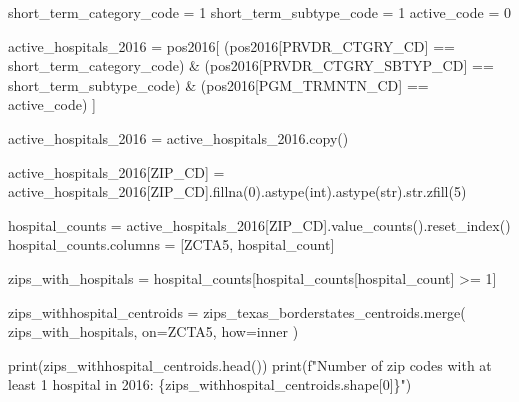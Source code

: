 \documentclass[
  letterpaper,
  DIV=11,
  numbers=noendperiod]{scrartcl}
\newenvironment{Shaded}{\begin{snugshade}}{\end{snugshade}}
\newcommand{\BuiltInTok}[1]{\textcolor[rgb]{0.00,0.23,0.31}{#1}}
\newcommand{\DecValTok}[1]{\textcolor[rgb]{0.68,0.00,0.00}{#1}}
\newcommand{\NormalTok}[1]{\textcolor[rgb]{0.00,0.23,0.31}{#1}}
\newcommand{\OperatorTok}[1]{\textcolor[rgb]{0.37,0.37,0.37}{#1}}
\newcommand{\SpecialCharTok}[1]{\textcolor[rgb]{0.37,0.37,0.37}{#1}}
\newcommand{\SpecialStringTok}[1]{\textcolor[rgb]{0.13,0.47,0.30}{#1}}
\newcommand{\StringTok}[1]{\textcolor[rgb]{0.13,0.47,0.30}{#1}}
\begin{document}
\begin{Shaded}
\begin{Highlighting}[]
\NormalTok{short\_term\_category\_code }\OperatorTok{=} \DecValTok{1}
\NormalTok{short\_term\_subtype\_code }\OperatorTok{=} \DecValTok{1}
\NormalTok{active\_code }\OperatorTok{=} \DecValTok{0}

\NormalTok{active\_hospitals\_2016 }\OperatorTok{=}\NormalTok{ pos2016[}
\NormalTok{    (pos2016[}\StringTok{\textquotesingle{}PRVDR\_CTGRY\_CD\textquotesingle{}}\NormalTok{] }\OperatorTok{==}\NormalTok{ short\_term\_category\_code) }\OperatorTok{\&}
\NormalTok{    (pos2016[}\StringTok{\textquotesingle{}PRVDR\_CTGRY\_SBTYP\_CD\textquotesingle{}}\NormalTok{] }\OperatorTok{==}\NormalTok{ short\_term\_subtype\_code) }\OperatorTok{\&}
\NormalTok{    (pos2016[}\StringTok{\textquotesingle{}PGM\_TRMNTN\_CD\textquotesingle{}}\NormalTok{] }\OperatorTok{==}\NormalTok{ active\_code)}
\NormalTok{]}

\NormalTok{active\_hospitals\_2016 }\OperatorTok{=}\NormalTok{ active\_hospitals\_2016.copy()}

\NormalTok{active\_hospitals\_2016[}\StringTok{\textquotesingle{}ZIP\_CD\textquotesingle{}}\NormalTok{] }\OperatorTok{=}\NormalTok{ active\_hospitals\_2016[}\StringTok{\textquotesingle{}ZIP\_CD\textquotesingle{}}\NormalTok{].fillna(}\DecValTok{0}\NormalTok{).astype(}\BuiltInTok{int}\NormalTok{).astype(}\BuiltInTok{str}\NormalTok{).}\BuiltInTok{str}\NormalTok{.zfill(}\DecValTok{5}\NormalTok{)}

\NormalTok{hospital\_counts }\OperatorTok{=}\NormalTok{ active\_hospitals\_2016[}\StringTok{\textquotesingle{}ZIP\_CD\textquotesingle{}}\NormalTok{].value\_counts().reset\_index()}
\NormalTok{hospital\_counts.columns }\OperatorTok{=}\NormalTok{ [}\StringTok{\textquotesingle{}ZCTA5\textquotesingle{}}\NormalTok{, }\StringTok{\textquotesingle{}hospital\_count\textquotesingle{}}\NormalTok{]}

\NormalTok{zips\_with\_hospitals }\OperatorTok{=}\NormalTok{ hospital\_counts[hospital\_counts[}\StringTok{\textquotesingle{}hospital\_count\textquotesingle{}}\NormalTok{] }\OperatorTok{\textgreater{}=} \DecValTok{1}\NormalTok{]}

\NormalTok{zips\_withhospital\_centroids }\OperatorTok{=}\NormalTok{ zips\_texas\_borderstates\_centroids.merge(}
\NormalTok{    zips\_with\_hospitals, on}\OperatorTok{=}\StringTok{\textquotesingle{}ZCTA5\textquotesingle{}}\NormalTok{, how}\OperatorTok{=}\StringTok{\textquotesingle{}inner\textquotesingle{}}
\NormalTok{)}

\BuiltInTok{print}\NormalTok{(zips\_withhospital\_centroids.head())}
\BuiltInTok{print}\NormalTok{(}\SpecialStringTok{f"Number of zip codes with at least 1 hospital in 2016: }\SpecialCharTok{\{}\NormalTok{zips\_withhospital\_centroids}\SpecialCharTok{.}\NormalTok{shape[}\DecValTok{0}\NormalTok{]}\SpecialCharTok{\}}\SpecialStringTok{"}\NormalTok{)}
\end{Highlighting}
\end{Shaded}
\end{document}
